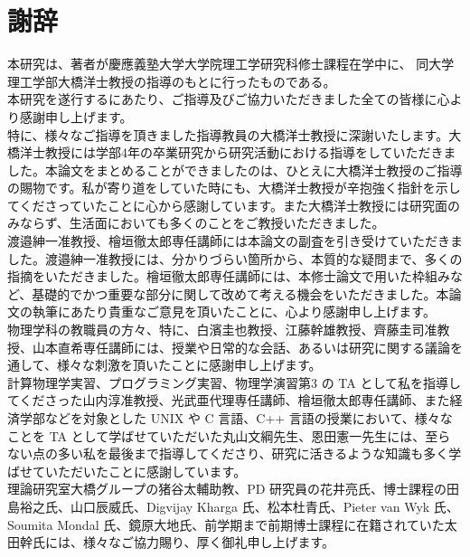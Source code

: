 \chapter*{謝辞}

本研究は、著者が慶應義塾大学大学院理工学研究科修士課程在学中に、
同大学理工学部大橋洋士教授の指導のもとに行ったものである。
\\

本研究を遂行するにあたり、ご指導及びご協力いただきました全ての皆様に心より感謝申し上げます。
\\

特に、様々なご指導を頂きました指導教員の大橋洋士教授に深謝いたします。大橋洋士教授には学部4年の卒業研究から研究活動における指導をしていただきました。本論文をまとめることができましたのは、ひとえに大橋洋士教授のご指導の賜物です。私が寄り道をしていた時にも、大橋洋士教授が辛抱強く指針を示してくださっていたことに心から感謝しています。また大橋洋士教授には研究面のみならず、生活面においても多くのことをご教授いただきました。
\\

渡邉紳一准教授、檜垣徹太郎専任講師には本論文の副査を引き受けていただきました。渡邉紳一准教授には、分かりづらい箇所から、本質的な疑問まで、多くの指摘をいただきました。檜垣徹太郎専任講師には、本修士論文で用いた枠組みなど、基礎的でかつ重要な部分に関して改めて考える機会をいただきました。本論文の執筆にあたり貴重なご意見を頂いたことに、心より感謝申し上げます。
\\

物理学科の教職員の方々、特に、白濱圭也教授、江藤幹雄教授、齊藤圭司准教授、山本直希専任講師には、授業や日常的な会話、あるいは研究に関する議論を通して、様々な刺激を頂いたことに感謝申し上げます。
\\

計算物理学実習、プログラミング実習、物理学演習第3 の TA として私を指導してくださった山内淳准教授、光武亜代理専任講師、檜垣徹太郎専任講師、また経済学部などを対象とした UNIX や C 言語、C++ 言語の授業において、様々なことを TA として学ばせていただいた丸山文綱先生、恩田憲一先生には、至らない点の多い私を最後まで指導してくださり、研究に活きるような知識も多く学ばせていただいたことに感謝しています。
\\

理論研究室大橋グループの猪谷太輔助教、PD 研究員の花井亮氏、博士課程の田島裕之氏、山口辰威氏、Digvijay Kharga 氏、松本杜青氏、Pieter van Wyk 氏、Soumita Mondal 氏、鏡原大地氏、前学期まで前期博士課程に在籍されていた太田幹氏には、様々なご協力賜り、厚く御礼申し上げます。

